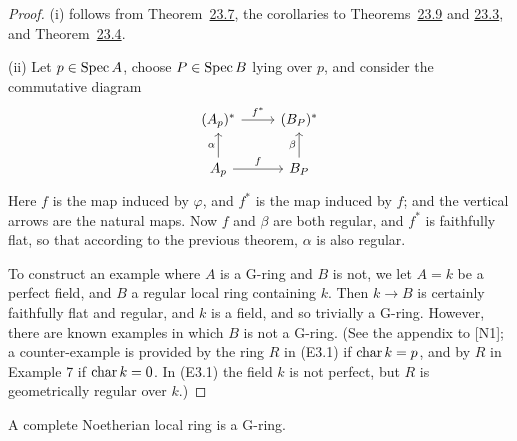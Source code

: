 \begin{proof}
(i) follows from Theorem~\hyperref[thm:23.7]{23.7}, the corollaries to
Theorems~\hyperref[thm:23.9]{23.9} and \hyperref[thm:23.3]{23.3}, and Theorem~\hyperref[thm:23.4]{23.4}.

(ii) Let $p \in \operatorname{Spec} A$, choose $P \in \operatorname{Spec} B$ lying over $p$, and consider the
commutative diagram
\[
\begin{tikzcd}
(A_p)^* \arrow[r, "f^*"] & (B_P)^* \\
A_p \arrow[u, "\alpha"] \arrow[r, "f"] & B_P \arrow[u, "\beta"]
\end{tikzcd}
\]
Here $f$ is the map induced by $\varphi$, and $f^*$ is the map induced by $f$; and the
vertical arrows are the natural maps. Now $f$ and $\beta$ are both regular, and $f^*$ is
faithfully flat, so that according to the previous theorem, $\alpha$ is also regular.

To construct an example where $A$ is a G-ring and $B$ is not, we let $A = k$ be a
perfect field, and $B$ a regular local ring containing $k$. Then $k \to B$ is certainly
faithfully flat and regular, and $k$ is a field, and so trivially a G-ring. However,
there are known examples in which $B$ is not a G-ring. (See the appendix to [N1];
a counter-example is provided by the ring $R$ in (E3.1) if $\operatorname{char} k = p$, and by $R$ in
Example 7 if $\operatorname{char} k = 0$. In (E3.1) the field $k$ is not perfect, but $R$ is
geometrically regular over $k$.)
\end{proof}

\begin{theorem}\label{thm:32.3}
A complete Noetherian local ring is a G-ring.
\end{theorem}

